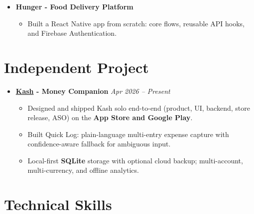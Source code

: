 \documentclass[a4paper,11pt]{article}
\begin{document}
\begin{itemize}[leftmargin=*]
\begin{itemize}[leftmargin=4mm]

\item \textbf{Hunger - Food Delivery Platform}

\begin{itemize}[leftmargin=4mm]

\item Built a React Native app from scratch: core flows, reusable API hooks, and Firebase Authentication.

\end{itemize}

\end{itemize}

\end{itemize}

\section*{Independent Project}

\begin{itemize}[leftmargin=*]

\item
\textbf{\href{https://kash.appmatters.in}{Kash} - Money Companion}
\hfill
\textit{Apr 2026 -- Present}

\begin{itemize}[leftmargin=4mm]

\item Designed and shipped Kash solo end-to-end (product, UI, backend, store release, ASO) on the \textbf{App Store and Google Play}.

\item Built Quick Log: plain-language multi-entry expense capture with confidence-aware fallback for ambiguous input.

\item Local-first \textbf{SQLite} storage with optional cloud backup; multi-account, multi-currency, and offline analytics.

\end{itemize}

\end{itemize}

\section*{Technical Skills}
\end{document}

